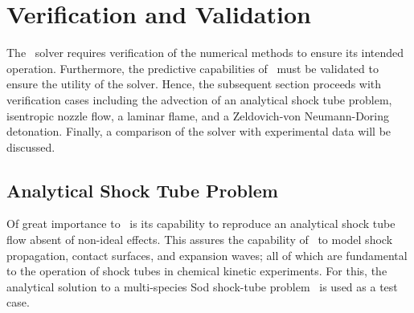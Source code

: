 \section{Verification and Validation}\label{SEC_VV}
The \stnshk\  solver requires verification of the numerical methods to ensure its intended operation. Furthermore, the predictive capabilities of \stnshk\ must be validated to ensure the utility of the solver. Hence, the subsequent section proceeds with verification cases including the advection of an analytical shock tube problem, isentropic nozzle flow, a laminar flame, and a Zeldovich-von Neumann-Doring detonation. Finally, a comparison of the solver with experimental data will be discussed.
\subsection{Analytical Shock Tube Problem}
Of great importance to \stnshk\ is its capability to reproduce an analytical shock tube flow absent of non-ideal effects. This assures the capability of \stnshk\ to model shock propagation, contact surfaces, and expansion waves; all of which are fundamental to the operation of shock tubes in chemical kinetic experiments. For this, the analytical solution to a multi-species Sod shock-tube problem~\cite{SOD_JCP78,LV_JCP2014} is used as a test case.

